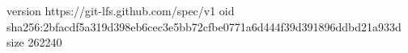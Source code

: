 version https://git-lfs.github.com/spec/v1
oid sha256:2bfacdf5a319d398eb6cec3e5bb72cfbe0771a6d444f39d391896ddbd21a933d
size 262240
